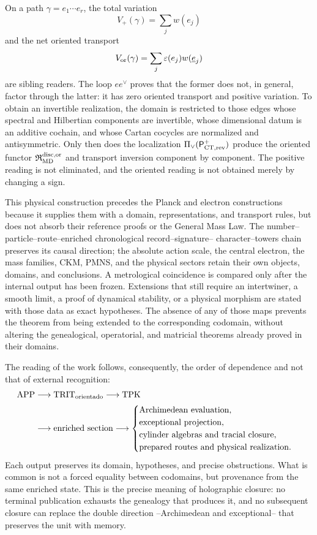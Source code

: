 On a path \(\gamma=e_1\cdots e_r\), the total variation
\[
 V_+(\gamma)=\sum_jw(e_j)
\]
and the net oriented transport
\[
 V_{\rm or}(\gamma)=\sum_j\varepsilon(e_j)w(\underline e_j)
\]
are sibling readers. The loop \(ee^\vee\) proves that the former does not,
in general, factor through the latter: it has zero oriented transport and
positive variation. To obtain an invertible realization, the domain is restricted
to those edges whose spectral and Hilbertian components are invertible, whose
dimensional datum is an additive cochain, and whose Cartan cocycles are normalized
and antisymmetric. Only then does the localization
\(\Pi_\vee(\mathsf P_{{\rm CT},{\rm rev}}^+)\) produce the oriented functor
\(\mathfrak R_{\rm MD}^{\rm disc,or}\) and transport inversion component by
component. The positive reading is not eliminated, and the oriented reading is not
obtained merely by changing a sign.

This physical construction precedes the Planck and electron constructions
because it supplies them with a domain, representations, and transport rules, but
does not absorb their reference proofs or the General Mass Law. The
number--particle--route--enriched chronological record--signature--
character--towers chain preserves its causal direction; the absolute action scale,
the central electron, the mass families, CKM, PMNS, and the physical sectors
retain their own objects, domains, and conclusions. A metrological coincidence is
compared only after the internal output has been frozen. Extensions that still
require an intertwiner, a smooth limit, a proof of dynamical stability,
or a physical morphism are stated with those data as exact hypotheses. The
absence of any of those maps prevents the theorem from being extended to the
corresponding codomain, without altering the genealogical, operatorial, and
matricial theorems already proved in their domains.

The reading of the work follows, consequently, the order of dependence and not that of external recognition:
\[
\begin{aligned}
 \mathrm{APP}&\longrightarrow\mathrm{TRIT}_{\rm orientado}
 \longrightarrow\mathrm{TPK}\\
 &\longrightarrow\text{enriched section}
 \longrightarrow
 \begin{cases}
  \text{Archimedean evaluation},\\
  \text{exceptional projection},\\
  \text{cylinder algebras and tracial closure},\\
  \text{prepared routes and physical realization}.
 \end{cases}
\end{aligned}
\]
Each output preserves its domain, hypotheses, and precise obstructions. What is common is not
a forced equality between codomains, but provenance from the same
enriched state. This is the precise meaning of holographic closure: no
terminal publication exhausts the genealogy that produces it, and no subsequent
closure can replace the double direction --Archimedean and exceptional--
that preserves the unit with memory.
